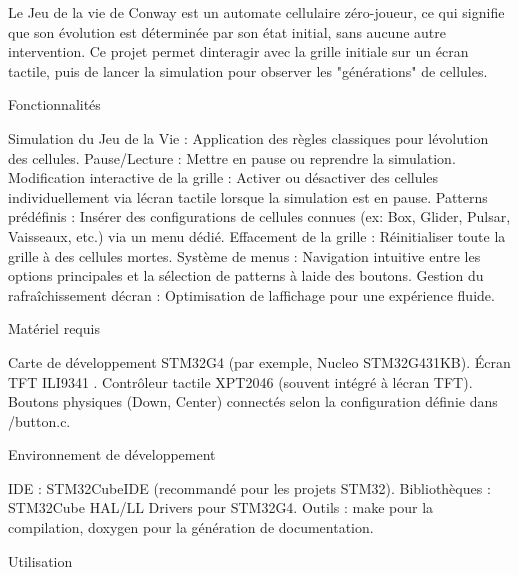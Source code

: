 Le Jeu de la vie de Conway est un automate cellulaire zéro-\/joueur, ce qui signifie que son évolution est déterminée par son état initial, sans aucune autre intervention. Ce projet permet d\textquotesingle{}interagir avec la grille initiale sur un écran tactile, puis de lancer la simulation pour observer les "{}générations"{} de cellules.
\begin{DoxyEnumerate}
\item Fonctionnalités

Simulation du Jeu de la Vie \+: Application des règles classiques pour l\textquotesingle{}évolution des cellules. Pause/\+Lecture \+: Mettre en pause ou reprendre la simulation. Modification interactive de la grille \+: Activer ou désactiver des cellules individuellement via l\textquotesingle{}écran tactile lorsque la simulation est en pause. Patterns prédéfinis \+: Insérer des configurations de cellules connues (ex\+: Box, Glider, Pulsar, Vaisseaux, etc.) via un menu dédié. Effacement de la grille \+: Réinitialiser toute la grille à des cellules mortes. Système de menus \+: Navigation intuitive entre les options principales et la sélection de patterns à l\textquotesingle{}aide des boutons. Gestion du rafraîchissement d\textquotesingle{}écran \+: Optimisation de l\textquotesingle{}affichage pour une expérience fluide.
\item Matériel requis

Carte de développement STM32\+G4 (par exemple, Nucleo STM32\+G431\+KB). Écran TFT ILI9341 . Contrôleur tactile XPT2046 (souvent intégré à l\textquotesingle{}écran TFT). Boutons physiques (Down, Center) connectés selon la configuration définie dans /button.c.
\item Environnement de développement

IDE \+: STM32\+Cube\+IDE (recommandé pour les projets STM32). Bibliothèques \+: STM32\+Cube HAL/\+LL Drivers pour STM32\+G4. Outils \+: make pour la compilation, doxygen pour la génération de documentation.
\item Utilisation
\end{DoxyEnumerate}

